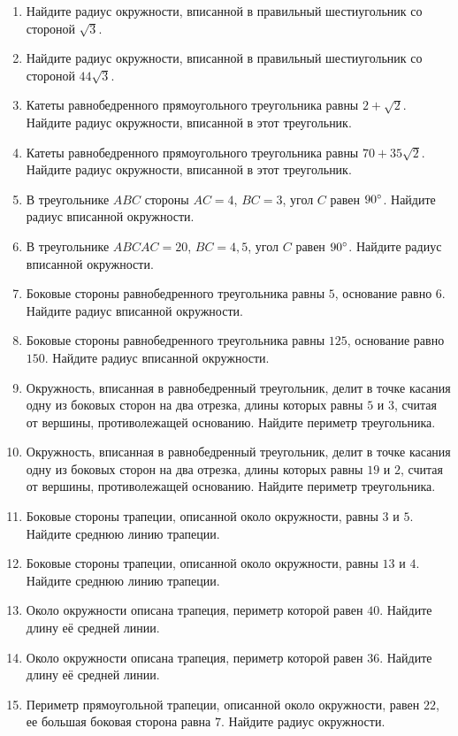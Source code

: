 \documentclass[12pt, a4paper]{article}
\begin{document}
\begin{enumerate}
		\item Найдите радиус окружности, вписанной в правильный шестиугольник со стороной  \( \sqrt{3} \).
		\item Найдите радиус окружности, вписанной в правильный шестиугольник со стороной \( 44\sqrt{3} \).
		\item Катеты равнобедренного прямоугольного треугольника равны \( 2+\sqrt{2} \). Найдите радиус окружности, вписанной в этот треугольник.
		\item Катеты равнобедренного прямоугольного треугольника равны \( 70+35\sqrt{2} \). Найдите радиус окружности, вписанной в этот треугольник.
		\item В треугольнике \( ABC \) стороны \( AC = 4 \), \( BC = 3 \), угол \( C \) равен \( 90\degree\). Найдите радиус вписанной окружности.
		\item В треугольнике \( ABC AC = 20 \), \( BC = 4,5 \), угол \( C \) равен \( 90\degree\). Найдите радиус вписанной окружности.
		\item Боковые стороны равнобедренного треугольника равны \( 5 \), основание равно \( 6 \). Найдите радиус вписанной окружности.
		\item Боковые стороны равнобедренного треугольника равны \( 125 \), основание равно \( 150 \). Найдите радиус вписанной окружности.
		\item Окружность, вписанная в равнобедренный треугольник, делит в точке касания одну из боковых сторон на два отрезка, длины которых равны \( 5  \) и \( 3 \), считая от вершины, противолежащей основанию. Найдите периметр треугольника.
		\item Окружность, вписанная в равнобедренный треугольник, делит в точке касания одну из боковых сторон на два отрезка, длины которых равны \( 19  \) и \( 2 \), считая от вершины, противолежащей основанию. Найдите периметр треугольника.
		\item Боковые стороны трапеции, описанной около окружности, равны \( 3  \) и \(  5 \). Найдите среднюю линию трапеции.
		\item Боковые стороны трапеции, описанной около окружности, равны \( 13 \) и \( 4 \). Найдите среднюю линию трапеции.
		\item Около окружности описана трапеция, периметр которой равен \( 40 \). Найдите длину её средней линии.
		\item Около окружности описана трапеция, периметр которой равен \( 36 \). Найдите длину её средней линии.
		\item Периметр прямоугольной трапеции, описанной около окружности, равен \( 22 \), ее большая боковая сторона равна \( 7 \). Найдите радиус окружности.

\end{enumerate}
\end{document}
